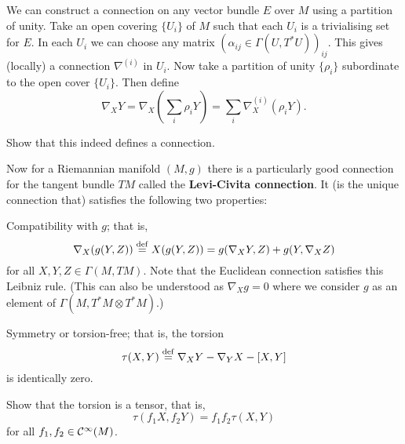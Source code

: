 \begin{rmk}
\begin{enum}
    \io
    We can construct a connection on any vector bundle $E$ over $M$ using a partition of unity.
    Take an open covering $\{U_i\}$ of $M$ such that each $U_i$ is a trivialising set for $E$.
    In each $U_i$ we can choose any matrix $(\alpha_{ij}\in\Gamma(U,T^*U))_{ij}$.
    This gives (locally) a connection $\nabla^{(i)}$ in $U_i$.
    Now take a partition of unity $\{\rho_i\}$ subordinate to the open cover $\{U_i\}$.
    Then define
    \[ \nabla_XY = \nabla_X (\sum_i\rho_iY) = \sum_i \nabla_X^{(i)}(\rho_iY). \]

    \begin{exer}
      Show that this indeed defines a connection.
    \end{exer}
  \end{enum}
\end{rmk}

Now for a Riemannian manifold $(M,g)$ there is a particularly good connection for the tangent bundle $TM$ called the \textbf{Levi-Civita connection}.
It (is the unique connection that) satisfies the following two properties:
\begin{enum}
  \io
  Compatibility with $g$; that is,
  \[ \nabla_X(g(Y,Z)) \overset{\mathrm{def}}{=} X(g(Y,Z)) = g(\nabla_XY,Z)+g(Y,\nabla_XZ) \]
  for all $X,Y,Z\in\Gamma(M,TM)$.
  Note that the Euclidean connection satisfies this Leibniz rule.
  (This can also be understood as $\nabla_Xg=0$ where we consider $g$ as an element of $\Gamma(M,T^*M\otimes T^*M)$.)

  \io
  Symmetry or torsion-free; that is, the torsion
  \[ \tau(X,Y) \overset{\mathrm{def}}{=} \nabla_XY-\nabla_YX-[X,Y] \]
  is identically zero.

  \begin{exer}
    Show that the torsion is a tensor, that is,
    \[ \tau(f_1X,f_2Y)=f_1f_2\tau(X,Y) \]
    for all $f_1,f_2\in\mathcal{C}^\infty(M)$.
  \end{exer}
\end{enum}

